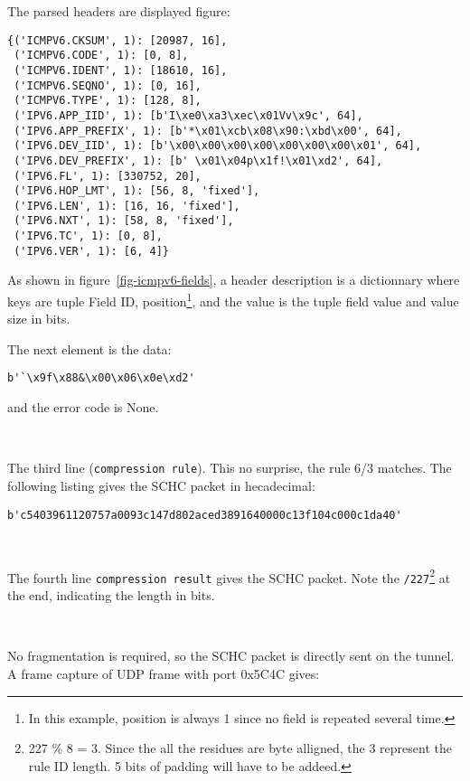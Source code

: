 The parsed headers are displayed figure:

\begin{lstlisting}[caption={Header Fields of an ICMPv6 message}, label=fig-icmpv6-fields]
{('ICMPV6.CKSUM', 1): [20987, 16],
 ('ICMPV6.CODE', 1): [0, 8],
 ('ICMPV6.IDENT', 1): [18610, 16],
 ('ICMPV6.SEQNO', 1): [0, 16],
 ('ICMPV6.TYPE', 1): [128, 8],
 ('IPV6.APP_IID', 1): [b'I\xe0\xa3\xec\x01Vv\x9c', 64],
 ('IPV6.APP_PREFIX', 1): [b'*\x01\xcb\x08\x90:\xbd\x00', 64],
 ('IPV6.DEV_IID', 1): [b'\x00\x00\x00\x00\x00\x00\x00\x01', 64],
 ('IPV6.DEV_PREFIX', 1): [b' \x01\x04p\x1f!\x01\xd2', 64],
 ('IPV6.FL', 1): [330752, 20],
 ('IPV6.HOP_LMT', 1): [56, 8, 'fixed'],
 ('IPV6.LEN', 1): [16, 16, 'fixed'],
 ('IPV6.NXT', 1): [58, 8, 'fixed'],
 ('IPV6.TC', 1): [0, 8],
 ('IPV6.VER', 1): [6, 4]}
\end{lstlisting}

As shown in figure~\vref{fig-icmpv6-fields}, a header description is a dictionnary where keys are tuple Field ID, position\footnote{In this example, position is always 1 since no field is repeated several time.}, and the value is the tuple field value and value size in bits.

The next element is the data:

\begin{lstlisting}
b'`\x9f\x88&\x00\x06\x0e\xd2'
\end{lstlisting}

and the error code is None.

~~

The third line (\texttt{compression rule}). This no surprise, the rule 6/3 matches. The following listing gives the SCHC packet in hecadecimal:


\begin{lstlisting}
b'c5403961120757a0093c147d802aced3891640000c13f104c000c1da40'
\end{lstlisting}

~~~

The fourth line \texttt{compression result} gives the SCHC packet. Note the \texttt{/227}\footnote {227 \% 8 = 3.  Since the all the residues are byte alligned, the 3 represent the rule ID length. 5 bits of padding will have to be addeed.} at the end, indicating the length in bits. 



~~

No fragmentation is required, so the SCHC packet is directly sent on the tunnel. A frame capture of UDP frame with port 0x5C4C gives:

